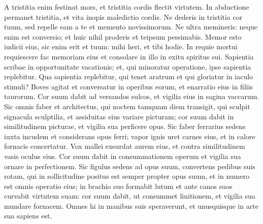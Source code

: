 \begin{biblechapter}
\begin{biblechapter}
\begin{biblechapter}
\begin{biblechapter}
\begin{biblechapter}
\begin{biblechapter}
\begin{biblechapter}
\begin{biblechapter}
\begin{biblechapter}
\begin{biblechapter}
\begin{biblechapter}
\begin{biblechapter}
\begin{biblechapter}
\begin{biblechapter}
\begin{biblechapter}
\begin{biblechapter}
\begin{biblechapter}
\begin{biblechapter}
\begin{biblechapter}
\begin{biblechapter}
\begin{biblechapter}
\begin{biblechapter}
\begin{biblechapter}
\begin{biblechapter}
\begin{biblechapter}
\begin{biblechapter}
\begin{biblechapter}
\begin{biblechapter}
\begin{biblechapter}
\begin{biblechapter}
\begin{biblechapter}
\begin{biblechapter}
\begin{biblechapter}
\begin{biblechapter}
\begin{biblechapter}
\begin{biblechapter}
\begin{biblechapter}
\begin{biblechapter}
 \verse A tristitia enim festinat mors,
 et tristitia cordis flectit virtutem.
 \verse In abductione permanet tristitia,
 et vita inopis maledictio cordis.
 \verse Ne dederis in tristitia cor tuum,
 sed repelle eam a te et memento novissimorum.
 \verse Ne ultra memineris: neque enim est conversio;
 et huic nihil proderis et teipsum pessimabis.
 \verse Memor esto iudicii eius, sic enim erit et tuum:
 mihi heri, et tibi hodie.
 \verse In requie mortui requiescere fac memoriam eius
 et consolare in illo in exitu spiritus sui.
 \verse Sapientia scribae in opportunitate vacationis;
 et, qui minoratur operatione, ipse sapientia replebitur.
 Qua sapientia replebitur, 
\verse qui tenet aratrum
 et qui gloriatur in iaculo stimuli?
 Boves agitat et conversatur in operibus eorum,
 et enarratio eius in filiis taurorum.
 \verse Cor suum dabit ad versandos sulcos,
 et vigilia eius in sagina vaccarum.
 \verse Sic omnis faber et architectus,
 qui noctem tamquam diem transigit,
 qui sculpit signacula sculptilia,
 et assiduitas eius variare picturam;
 cor suum dabit in similitudinem picturae,
 et vigilia sua perficere opus.
 \verse Sic faber ferrarius sedens iuxta incudem
 et considerans opus ferri;
 vapor ignis uret carnes eius,
 et in calore fornacis concertatur.
 \verse Vox mallei exsurdat aurem eius,
 et contra similitudinem vasis oculus eius.
 \verse Cor suum dabit in consummationem operum
 et vigilia sua ornare in perfectionem.
 \verse Sic figulus sedens ad opus suum,
 convertens pedibus suis rotam,
 qui in sollicitudine positus est semper propter opus suum,
 et in numero est omnis operatio eius;
 \verse in brachio suo formabit lutum
 et ante canos suos curvabit virtutem suam:
 \verse cor suum dabit, ut consummet linitionem,
 et vigilia sua mundare fornacem.
 \verse Omnes hi in manibus suis speraverunt,
 et unusquisque in arte sua sapiens est.

\end{biblechapter}
\end{biblechapter}
\end{biblechapter}
\end{biblechapter}
\end{biblechapter}
\end{biblechapter}
\end{biblechapter}
\end{biblechapter}
\end{biblechapter}
\end{biblechapter}
\end{biblechapter}
\end{biblechapter}
\end{biblechapter}
\end{biblechapter}
\end{biblechapter}
\end{biblechapter}
\end{biblechapter}
\end{biblechapter}
\end{biblechapter}
\end{biblechapter}
\end{biblechapter}
\end{biblechapter}
\end{biblechapter}
\end{biblechapter}
\end{biblechapter}
\end{biblechapter}
\end{biblechapter}
\end{biblechapter}
\end{biblechapter}
\end{biblechapter}
\end{biblechapter}
\end{biblechapter}
\end{biblechapter}
\end{biblechapter}
\end{biblechapter}
\end{biblechapter}
\end{biblechapter}
\end{biblechapter}
